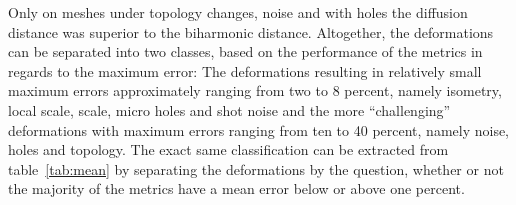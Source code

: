 Only on meshes under topology changes, noise and with holes the diffusion distance was superior to the biharmonic distance.
Altogether, the deformations can be separated into two classes, based on the performance of the metrics in regards to the  maximum error:
The deformations resulting in relatively small maximum errors approximately ranging from two to 8 percent, namely isometry, local scale, scale, micro holes and shot noise and the more ``challenging'' deformations with maximum errors ranging from ten to 40 percent, namely noise, holes and topology.
The exact same classification can be extracted from table~\ref{tab:mean} by separating the deformations by the question, whether or not the majority of the metrics have a mean error below or above one percent.
